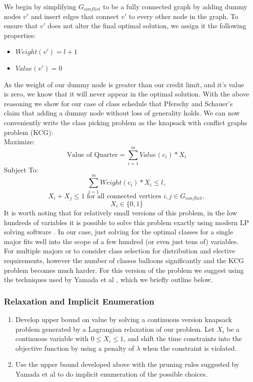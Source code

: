 \documentclass[11pt]{article} %
\begin{document}
We begin by simplifying $G_{conflict}$ to be a fully connected graph by adding
dummy nodes $v'$ and insert edges that connect $v'$ to every other node in the
graph. To ensure that $v'$ does not alter the final optimal solution, we assign
it the following properties: \begin{itemize} \item $Weight(v') = l+1$ \item
$Value(v') = 0$ \end{itemize} As the weight of our dummy node is greater than
our credit limit, and it's value is zero, we know that it will never appear in
the optimal solution. With the above reasoning we show for our case of class
schedule that Pferschy and Schauer's \cite{pferschy:kcg} claim that adding
a dummy node without loss of generality holds. We can now conveniently write the
class picking problem as the knapsack with conflict graphs problem (KCG): \\
Maximize: $$ \text{Value of Quarter} = \sum_{i=1}^m Value(c_i) * X_i $$ Subject
To: $$ \sum_{i=1}^m Weight(c_i) * X_i \leq l, $$ $$ X_i + X_j \leq 1 \text{ for
all connected vertices } i, j \in G_{conflict}, $$ $$ X_i \in \{0, 1\} $$ It is
worth noting that for relatively small versions of this problem, in the low
hundreds of variables it is possible to solve this problem exactly using modern
LP solving software \cite{yamada:heuristic}. In our case, just solving for the
optimal classes for a single major fits well into the scope of a few hundred (or
even just tens of) variables. For multiple majors or to consider class selection
for distribution and elective requirements, however the number of classes
balloons significantly and the KCG problem becomes much harder. For this version
of the problem we suggest using the techniques used by Yamada et al
\cite{yamada:heuristic}, which we briefly outline below.

\subsubsection{Relaxation and Implicit Enumeration} \begin{enumerate} \item
Develop upper bound on value by solving a continuous version knapsack problem
generated by a Lagrangian relaxation of our problem. Let $X_i$ be a continuous
variable with $0 \leq X_i \leq 1$, and shift the time constraints into the
objective function by using a penalty of $\lambda$ when the constraint is
violated.  \item Use the upper bound developed above with the pruning rules
suggested by Yamada et al \cite{yamada:heuristic} to do implicit enumeration of
the possible choices.  \end{enumerate}
\end{document}
